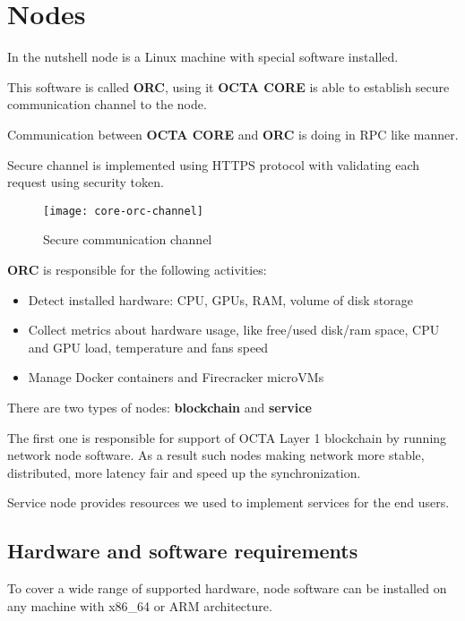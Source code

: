 \section{Nodes}

In the nutshell node is a Linux machine with special software installed.

This software is called \textbf{ORC}, using it \textbf{OCTA CORE} is able to establish secure communication channel to the node.

Communication between \textbf{OCTA CORE} and \textbf{ORC} is doing in RPC\cite{rpc} like manner.

Secure channel is implemented using HTTPS\cite{https} protocol with validating each request using security token.

\begin{figure}[H]
    \centering
    \texttt{[image: core-orc-channel]}
    \caption{Secure communication channel}
\end{figure}

\textbf{ORC} is responsible for the following activities:

\begin{itemize}
    \item Detect installed hardware: CPU, GPUs, RAM, volume of disk storage
    \item Collect metrics about hardware usage, like free/used disk/ram space, CPU and GPU load, temperature and fans speed
    \item Manage Docker\cite{docker} containers and Firecracker\cite{firecracker} microVMs
\end{itemize}

There are two types of nodes: \textbf{blockchain} and \textbf{service}

The first one is responsible for support of OCTA Layer 1 blockchain by running network node software.
As a result such nodes making network more stable, distributed, more latency fair and speed up the synchronization.

Service node provides resources we used to implement services for the end users.

\subsection{Hardware and software requirements}

To cover a wide range of supported hardware, node software can be installed on any machine with x86\_64\cite{x86_64} or ARM\cite{arm} architecture.

